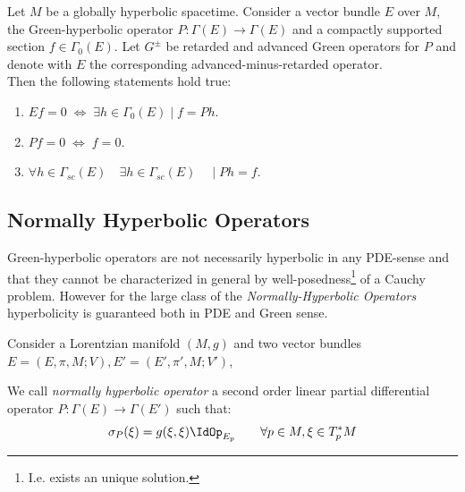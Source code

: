 \documentclass[Main]{subfiles}
\begin{document}
			
			\begin{corollary}\label{Corol:GreenKernel}
				Let $M$ be a globally hyperbolic spacetime. Consider a vector bundle $E$ over $M$, the Green-hyperbolic operator $P: \Gamma(E)\rightarrow \Gamma(E)$ and a compactly supported section $f\in \Gamma_{0}(E)$.
				Let $G^\pm$ be retarded and advanced Green operators for $P$ and denote with $E$ the corresponding advanced-minus-retarded operator.\\
				Then the following statements hold true:
					\begin{enumerate}
						\item $E f = 0 \; \Leftrightarrow \;  \exists h \in \Gamma_{0}(E) \; \vert \; f=P h $.
						\item $P f = 0 \; \Leftrightarrow \; f=0$.
						\item $\forall h \in \Gamma_{sc}(E)\quad \exists h \in \Gamma_{sc}(E)\quad \; \vert \; P h = f$.
					\end{enumerate}
			\end{corollary}
					
		\subsection{Normally Hyperbolic Operators}
			Green-hyperbolic operators are not necessarily hyperbolic in any PDE-sense and that they cannot be characterized in general by well-posedness\footnote{I.e. exists an unique solution.} of a Cauchy problem.
			However  for the large class of the \emph{Normally-Hyperbolic Operators} hyperbolicity is guaranteed both in PDE and Green sense.

		Consider a Lorentzian manifold $(M,g)$ and two vector bundles $E=(E,\pi,M;V), E'=(E',\pi',M;V')$,
		\begin{definition}\label{Def:NormalHyperOper}
			We call \emph{normally hyperbolic operator} a second order linear partial differential operator $P:\Gamma(E)\rightarrow \Gamma(E')$ such that:
			\begin{displaymath}
				\sigma_P(\xi) = g(\xi,\xi) \IdOp_{E_p} \qquad \forall p\in M, \xi \in T^*_pM
			\end{displaymath}
		\end{definition}
		
\end{document}
